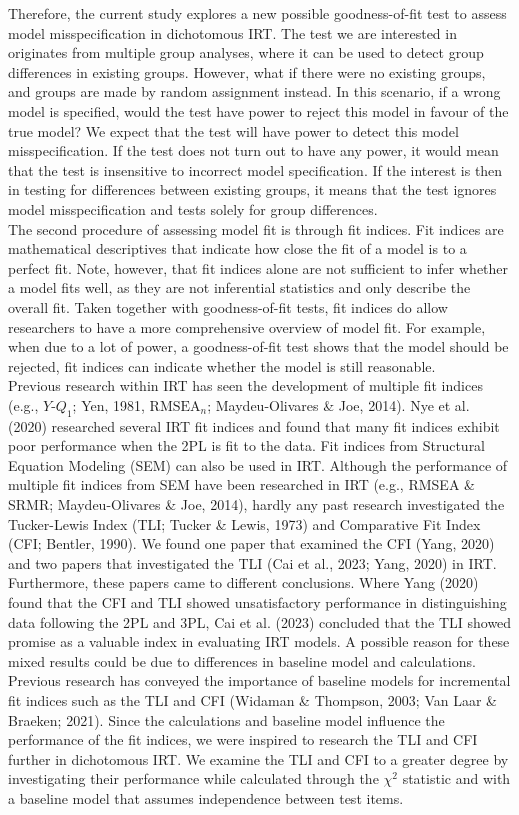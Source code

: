 \documentclass[Royal,sageapa,times,doublespace]{sagej}
\begin{document}
\indent Therefore, the current study explores a new possible goodness-of-fit test to assess model misspecification in dichotomous IRT. The test we are interested in originates from multiple group analyses, where it can be used to detect group differences in existing groups. However, what if there were no existing groups, and groups are made by random assignment instead. In this scenario, if a wrong model is specified, would the test have power to reject this model in favour of the true model? We expect that the test will have power to detect this model misspecification. If the test does not turn out to have any power, it would mean that the test is insensitive to incorrect model specification. If the interest is then in testing for differences between existing groups, it means that the test ignores model misspecification and tests solely for group differences. \\
\indent The second procedure of assessing model fit is through fit indices. Fit indices are mathematical descriptives that indicate how close the fit of a model is to a perfect fit. Note, however, that fit indices alone are not sufficient to infer whether a model fits well, as they are not inferential statistics and only describe the overall fit. Taken together with goodness-of-fit tests, fit indices do allow researchers to have a more comprehensive overview of model fit. For example, when due to a lot of power, a goodness-of-fit test shows that the model should be rejected, fit indices can indicate whether the model is still reasonable. \\ 
\indent Previous research within IRT has seen the development of multiple fit indices (e.g., $Y\text{-}Q_1$; Yen, 1981, $\text{RMSEA}_n$; Maydeu-Olivares \& Joe, 2014). Nye et al. (2020) researched several IRT fit indices and found that many fit indices exhibit poor performance when the 2PL is fit to the data. Fit indices from Structural Equation Modeling (SEM) can also be used in IRT. Although the performance of multiple fit indices from SEM have been researched in IRT (e.g., RMSEA \& SRMR; Maydeu-Olivares \& Joe, 2014), hardly any past research investigated the Tucker-Lewis Index (TLI; Tucker \& Lewis, 1973) and Comparative Fit Index (CFI; Bentler, 1990). We found one paper that examined the CFI (Yang, 2020) and two papers that investigated the TLI (Cai et al., 2023; Yang, 2020) in IRT. Furthermore, these papers came to different conclusions. Where Yang (2020) found that the CFI and TLI showed unsatisfactory performance in distinguishing data following the 2PL and 3PL, Cai et al. (2023) concluded that the TLI showed promise as a valuable index in evaluating IRT models. A possible reason for these mixed results could be due to differences in baseline model and calculations. Previous research has conveyed the importance of baseline models for incremental fit indices such as the TLI and CFI (Widaman \& Thompson, 2003; Van Laar \& Braeken; 2021). Since the calculations and baseline model influence the performance of the fit indices, we were inspired to research the TLI and CFI further in dichotomous IRT. We examine the TLI and CFI to a greater degree by investigating their performance while calculated through the $\chi^2$ statistic and with a baseline model that assumes independence between test items. \\
\end{document}
